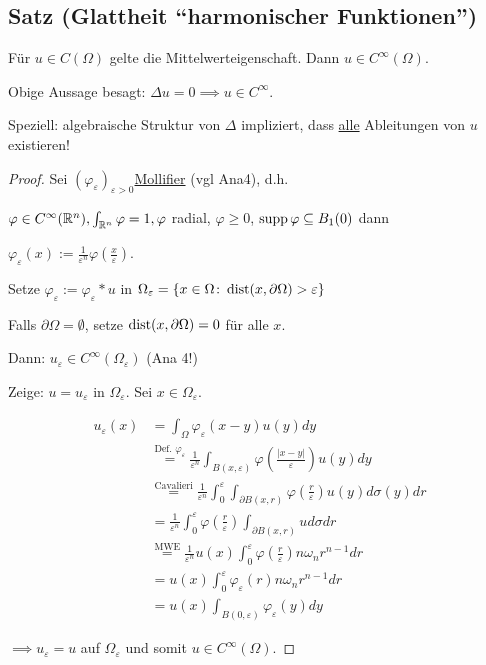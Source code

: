 \subsection{Satz (Glattheit ``harmonischer Funktionen'')}

Für $u \in C(\Omega)$ gelte die Mittelwerteigenschaft. 
Dann $u \in C^\infty(\Omega)$.

\begin{bem}
  Obige Aussage besagt: $\Delta u = 0 \implies u \in C^\infty$.

  Speziell: algebraische Struktur von $\Delta$ impliziert, dass \underline{alle} Ableitungen von $u$ existieren!
\end{bem}

\begin{proof}
  Sei $(\varphi_\varepsilon)_{\varepsilon > 0} $\underline{Mollifier} (vgl Ana4), d.h.
  
  $\varphi \in C^\infty(\mathbb{R}^n), \int_{\mathbb{R}^n} \varphi = 1, \varphi $ radial, $\varphi \geq 0$, $\operatorname{supp} \varphi \subseteq B_1(0)$ dann

  $\varphi_\varepsilon(x) := \frac{1}{\varepsilon^n} \varphi(\frac{x}{\varepsilon})$.

  Setze $\varphi_\varepsilon := \varphi_\varepsilon \ast u$ in $\Omega_\varepsilon = \{x \in \Omega \colon \operatorname{dist}(x, \partial \Omega) > \varepsilon \}$

  {\tiny{Falls $\partial \Omega = \emptyset$, setze $\operatorname{dist}(x, \partial\Omega) = 0$ für alle $x$.}}

  Dann: $u_\varepsilon \in C^\infty(\Omega_\varepsilon)$ (Ana 4!)

  Zeige: $u = u_\varepsilon$ in $\Omega_\varepsilon$. Sei $x \in \Omega_\varepsilon$.

  \begin{align*}
    u_\varepsilon(x) &= \int_\Omega \varphi_\varepsilon(x - y) u(y) dy \\
    &\overset{\text{Def. } \varphi_\varepsilon}{=} \frac{1}{\varepsilon^n} \int_{B(x,\varepsilon)} \varphi\left(\frac{|x - y|}{\varepsilon}\right) u(y) dy \\
    &\overset{\text{Cavalieri}}{=} \frac{1}{\varepsilon^n} \int_0^\varepsilon \int_{\partial B(x,r)} \varphi\left(\frac{r}{\varepsilon}\right) u(y) d\sigma(y) dr \\
    &= \frac{1}{\varepsilon^n} \int_0^\varepsilon \varphi(\frac{r}{\varepsilon}) \int_{\partial B(x,r)} u d\sigma dr \\
    &\overset{\text{MWE}}{=} \frac{1}{\varepsilon^n} u(x) \int_0^\varepsilon \varphi(\frac{r}{\varepsilon}) n \omega_n r^{n - 1} dr \\
    &= u(x) \int_0^\varepsilon \varphi_\varepsilon(r) n \omega_n r^{n - 1} dr \\
    &= u(x) \int_{B(0,\varepsilon)} \varphi_\varepsilon (y) dy
  \end{align*}

  $\implies u_\varepsilon = u$ auf $\Omega_\varepsilon$ und somit $u \in C^\infty(\Omega)$.
\end{proof}

